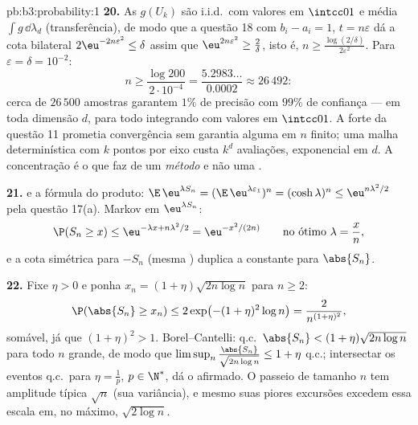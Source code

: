 \begin{solution}{pb:b3:probability:1}
\textbf{20.} As $g(U_k)$ são i.i.d.\ com valores em
$\intcc01$ e média $\int g\,\dd\lambda_d$ (transferência), de modo que
a questão 18 com $b_i - a_i = 1$, $t = n\varepsilon$ dá
a cota bilateral $2\eu^{-2n\varepsilon^2} \leq \delta$
assim que $\eu^{2n\varepsilon^2} \geq \frac2\delta$, isto é,
$n \geq \frac{\log(2/\delta)}{2\varepsilon^2}$. Para
$\varepsilon = \delta = 10^{-2}$:
\[
n \geq \frac{\log 200}{2\cdot10^{-4}} =
\frac{5.2983\ldots}{0.0002} \approx 26\,492 :
\]
cerca de $26\,500$ amostras garantem $1\%$ de precisão com
$99\%$ de confiança --- em toda dimensão $d$, para todo
integrando  com valores em $\intcc01$. A  forte
da questão 11 prometia convergência sem garantia alguma em
$n$ finito; uma malha determinística com $k$ pontos por eixo
custa $k^d$ avaliações, exponencial em $d$. A concentração
é o que faz de  um \emph{método} e não uma
.

\textbf{21.}  e a fórmula do produto:
$\E\,\eu^{\lambda S_n} = (\E\,\eu^{\lambda\varepsilon_1})^n
= (\cosh\lambda)^n \leq \eu^{n\lambda^2/2}$ pela questão
17(a). Markov em $\eu^{\lambda S_n}$:
\[
\P(S_n \geq x) \leq \eu^{-\lambda x + n\lambda^2/2}
= \eu^{-x^2/(2n)}
\qquad\text{no ótimo } \lambda = \frac xn,
\]
e a cota simétrica para $-S_n$ (mesma ) duplica a
constante para $\abs{S_n}$.

\textbf{22.} Fixe $\eta > 0$ e ponha $x_n = (1 +
\eta)\sqrt{2n\log n}$ para $n \geq 2$:
\[
\P(\abs{S_n} \geq x_n) \leq 2\exp\bigl(-(1 +
\eta)^2\log n\bigr) = \frac{2}{n^{(1+\eta)^2}},
\]
somável, já que $(1 + \eta)^2 > 1$. Borel--Cantelli: q.c.\
$\abs{S_n} < (1 + \eta)\sqrt{2n\log n}$ para todo $n$ grande,
de modo que $\limsup_n\frac{\abs{S_n}}{\sqrt{2n\log n}} \leq 1 +
\eta$ q.c.; intersectar os eventos q.c.\ para $\eta =
\frac1p$, $p \in \N^*$, dá o afirmado. O passeio de tamanho
$n$ tem amplitude típica $\sqrt n$ (sua variância), e
mesmo suas piores excursões excedem essa escala em, no máximo,
$\sqrt{2\log n}$.


\end{solution}
